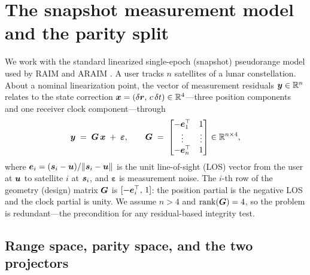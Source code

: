 \section{The snapshot measurement model and the parity split}
\label{sec:model}

We work with the standard linearized single-epoch (snapshot) pseudorange model used by
RAIM and ARAIM \citep{parkinson1988,brown1992,blanch2015}. A user tracks $n$ satellites
of a lunar constellation. About a nominal linearization point, the vector of
measurement residuals $\bm{y}\in\mathbb{R}^{n}$ relates to the state correction
$\bm{x}=(\delta\bm r,\,c\,\delta t)\in\mathbb{R}^{4}$---three position components and one receiver
clock component---through
\begin{equation}
  \bm{y} \;=\; \bm{G}\,\bm{x} \;+\; \bm\varepsilon,
  \qquad
  \bm{G} \;=\;
  \begin{bmatrix}
    -\bm{e}_1^\top & 1 \\
    \vdots & \vdots \\
    -\bm{e}_n^\top & 1
  \end{bmatrix}
  \in \mathbb{R}^{n\times4},
  \label{eq:measmodel}
\end{equation}
where $\bm{e}_i=(\bm{s}_i-\bm{u})/\|\bm{s}_i-\bm{u}\|$ is the unit line-of-sight (LOS) vector from the
user at $\bm{u}$ to satellite $i$ at $\bm{s}_i$, and $\bm\varepsilon$ is measurement noise. The
$i$-th row of the geometry (design) matrix $\bm{G}$ is $[-\bm{e}_i^\top,\,1]$: the position
partial is the negative LOS and the clock partial is unity. We assume $n>4$ and
$\operatorname{rank}(\bm{G})=4$, so the problem is redundant---the precondition for any residual-based
integrity test.

\subsection{Range space, parity space, and the two projectors}
\label{sec:projectors}

